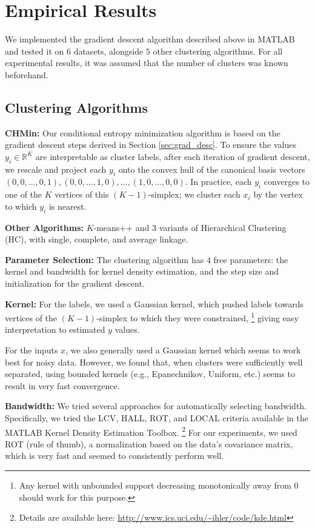 \documentclass{article} %
\newcommand{\R}{{\mathbb{R}}}
\begin{document}
\section{Empirical Results}
We implemented the gradient descent algorithm described above in MATLAB and
tested it on $6$ datasets, alongside $5$ other clustering algorithms. For all
experimental results, it was assumed that the number of clusters was known
beforehand.

\subsection{Clustering Algorithms}
\label{subsec:algos}
{\bf CHMin:} Our conditional entropy minimization algorithm is based on the
gradient descent steps derived in Section \ref{sec:grad_desc}. To ensure the
values $y_i \in \R^K$ are interpretable as cluster labels, after each
iteration of gradient descent, we rescale and project each $y_i$ onto the
convex hull of the canonical basis vectors
$(0,0,\dots,0,1), (0,0,\dots,1,0), \dots, (1,0,\dots,0,0)$. In practice, each
$y_i$ converges to one of the $K$ vertices of this $(K - 1)$-simplex;
we cluster each $x_i$ by the vertex to which $y_i$ is nearest.

{\bf Other Algorithms:}
$K$-means++ and $3$ variants of Hierarchical Clustering (HC), with single,
complete, and average linkage.

{\bf Parameter Selection:}
The clustering algorithm has $4$ free parameters: the kernel and bandwidth for
kernel density estimation, and the step size and initialization for the
gradient descent.

{\bf Kernel:} For the labels, we used a Gaussian kernel, which pushed
labels towards vertices of the $(K - 1)$-simplex to which they were
constrained, \footnote{Any kernel with unbounded support decreasing
monotonically away from $0$ should work for this purpose.} giving easy
interpretation to estimated $y$ values.

For the inputs $x$, we also generally used a Gaussian kernel which seems to
work best for noisy data. However, we found that, when clusters were
sufficiently well separated, using bounded kernels (e.g., Epanechnikov,
Uniform, etc.) seems to result in very fast convergence.

{\bf Bandwidth:} We tried several approaches for automatically selecting
bandwidth. Specifically, we tried the LCV, HALL, ROT, and LOCAL criteria
available in the MATLAB Kernel Density Estimation Toolbox.\!
\footnote{Details are available here:
\url{http://www.ics.uci.edu/~ihler/code/kde.html}}
For our experiments, we used ROT (rule of thumb), a normalization based on the
data's covariance matrix, which is very fast and seemed to consistently perform
well.
\end{document}
